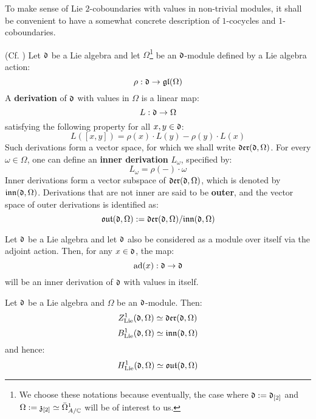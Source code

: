         To make sense of Lie $2$-coboundaries with values in non-trivial modules, it shall be convenient to have a somewhat concrete description of $1$-cocycles and $1$-coboundaries.
        \begin{definition} \label{def: lie_derivations}
            (Cf. \cite[Section VII.2, Equation 2.2, p. 234]{hilton_stammbach_homological_algebra}) Let $\mathfrak{d}$ be a Lie algebra and let $\Omega$\footnote{We choose these notations because eventually, the case where $\mathfrak{d} := \mathfrak{d}_{[2]}$ and $\Omega := \mathfrak{z}_{[2]} \simeq \bar{\Omega}^1_{A/\mathbb{C}}$ will be of interest to us.} be an $\mathfrak{d}$-module defined by a Lie algebra action:
                $$\rho: \mathfrak{d} \to \mathfrak{gl}(\Omega)$$
            A \textbf{derivation} of $\mathfrak{d}$ with values in $\Omega$ is a linear map:
                $$L: \mathfrak{d} \to \Omega$$
            satisfying the following property for all $x, y \in \mathfrak{d}$:
                $$L( [x, y] ) = \rho(x) \cdot L(y) - \rho(y) \cdot L(x)$$
            Such derivations form a vector space, for which we shall write $\mathfrak{der}(\mathfrak{d}, \Omega)$. For every $\omega \in \Omega$, one can define an \textbf{inner derivation} $L_{\omega}$, specified by:
                $$L_{\omega} = \rho(-) \cdot \omega$$
            Inner derivations form a vector subspace of $\mathfrak{der}(\mathfrak{d}, \Omega)$, which is denoted by $\mathfrak{inn}(\mathfrak{d}, \Omega)$. Derivations that are not inner are said to be \textbf{outer}, and the vector space of outer derivations is identified as:
                $$\mathfrak{out}(\mathfrak{d}, \Omega) := \mathfrak{der}(\mathfrak{d}, \Omega)/\mathfrak{inn}(\mathfrak{d}, \Omega)$$
        \end{definition}
        \begin{example}
            Let $\mathfrak{d}$ be a Lie algebra and let $\mathfrak{d}$ also be considered as a module over itself via the adjoint action. Then, for any $x \in \mathfrak{d}$, the map:
                $$\mathrm{ad}(x): \mathfrak{d} \to \mathfrak{d}$$
            will be an inner derivation of $\mathfrak{d}$ with values in itself.
        \end{example}
        \begin{theorem}
            \cite[Theorem 2.1 and Proposition 2.2]{hilton_stammbach_homological_algebra} Let $\mathfrak{d}$ be a Lie algebra and $\Omega$ be an $\mathfrak{d}$-module. Then:
                $$Z^1_{\mathrm{Lie}}(\mathfrak{d}, \Omega) \simeq \mathfrak{der}(\mathfrak{d}, \Omega)$$
                $$B^1_{\mathrm{Lie}}(\mathfrak{d}, \Omega) \simeq \mathfrak{inn}(\mathfrak{d}, \Omega)$$
            and hence:
                $$H^1_{\mathrm{Lie}}(\mathfrak{d}, \Omega) \simeq \mathfrak{out}(\mathfrak{d}, \Omega)$$
        \end{theorem}
